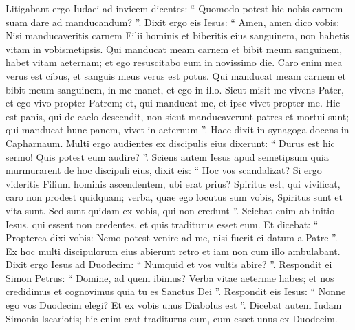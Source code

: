 \begin{biblechapter}
\begin{biblechapter}
\begin{biblechapter}
\begin{biblechapter}
\begin{biblechapter}
\begin{biblechapter}
 \verse Litigabant ergo Iudaei ad invicem dicentes: “ Quomodo potest hic nobis carnem suam dare ad manducandum? ”. 
\verse Dixit ergo eis Iesus: “ Amen, amen dico vobis: Nisi manducaveritis carnem Filii hominis et biberitis eius sanguinem, non habetis vitam in vobismetipsis. 
\verse Qui manducat meam carnem et bibit meum sanguinem, habet vitam aeternam; et ego resuscitabo eum in novissimo die. 
\verse Caro enim mea verus est cibus, et sanguis meus verus est potus. 
\verse Qui manducat meam carnem et bibit meum sanguinem, in me manet, et ego in illo. 
 \verse Sicut misit me vivens Pater, et ego vivo propter Patrem; et, qui manducat me, et ipse vivet propter me. 
\verse Hic est panis, qui de caelo descendit, non sicut manducaverunt patres et mortui sunt; qui manducat hunc panem, vivet in aeternum ”. 
\verse Haec dixit in synagoga docens in Capharnaum. 
\verse Multi ergo audientes ex discipulis eius dixerunt: “ Durus est hic sermo! Quis potest eum audire? ”. 
\verse Sciens autem Iesus apud semetipsum quia murmurarent de hoc discipuli eius, dixit eis: “ Hoc vos scandalizat? 
\verse Si ergo videritis Filium hominis ascendentem, ubi erat prius? 
\verse Spiritus est, qui vivificat, caro non prodest quidquam; verba, quae ego locutus sum vobis, Spiritus sunt et vita sunt. 
 \verse Sed sunt quidam ex vobis, qui non credunt ”. Sciebat enim ab initio Iesus, qui essent non credentes, et quis traditurus esset eum. 
\verse Et dicebat: “ Propterea dixi vobis: Nemo potest venire ad me, nisi fuerit ei datum a Patre ”.
 \verse Ex hoc multi discipulorum eius abierunt retro et iam non cum illo ambulabant. 
\verse Dixit ergo Iesus ad Duodecim: “ Numquid et vos vultis abire? ”. 
\verse Respondit ei Simon Petrus: “ Domine, ad quem ibimus? Verba vitae aeternae habes; 
 \verse et nos credidimus et cognovimus quia tu es Sanctus Dei ”. 
\verse Respondit eis Iesus: “ Nonne ego vos Duodecim elegi? Et ex vobis unus Diabolus est ”. 
 \verse Dicebat autem Iudam Simonis Iscariotis; hic enim erat traditurus eum, cum esset unus ex Duodecim.
 

\end{biblechapter}
\end{biblechapter}
\end{biblechapter}
\end{biblechapter}
\end{biblechapter}
\end{biblechapter}

